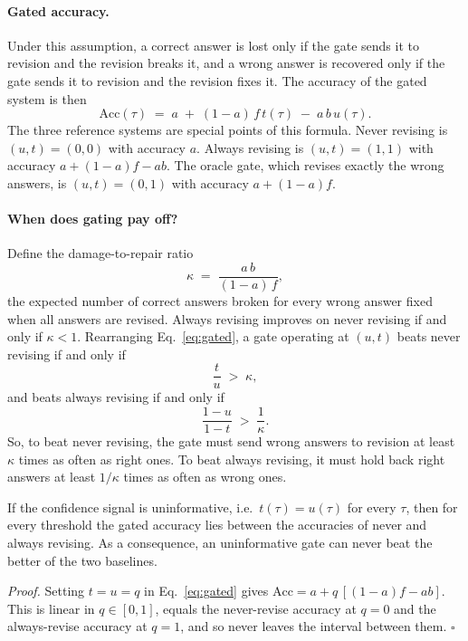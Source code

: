 \paragraph{Gated accuracy.} Under this assumption, a correct answer is lost only if the gate sends it to revision and the revision breaks it, and a wrong answer is recovered only if the gate sends it to revision and the revision fixes it. The accuracy of the gated system is then
\begin{equation}
\mathrm{Acc}(\tau) \;=\; a \;+\; (1-a)\,f\,t(\tau) \;-\; a\,b\,u(\tau).
\label{eq:gated}
\end{equation}
The three reference systems are special points of this formula. Never revising is $(u,t)=(0,0)$ with accuracy $a$. Always revising is $(u,t)=(1,1)$ with accuracy $a+(1-a)f-ab$. The oracle gate, which revises exactly the wrong answers, is $(u,t)=(0,1)$ with accuracy $a+(1-a)f$.

\paragraph{When does gating pay off?} Define the damage-to-repair ratio
\begin{equation}
\kappa \;=\; \frac{a\,b}{(1-a)\,f},
\end{equation}
the expected number of correct answers broken for every wrong answer fixed when all answers are revised. Always revising improves on never revising if and only if $\kappa<1$. Rearranging Eq.~\eqref{eq:gated}, a gate operating at $(u,t)$ beats never revising if and only if
\begin{equation}
\frac{t}{u} \;>\; \kappa,
\label{eq:beat_never}
\end{equation}
and beats always revising if and only if
\begin{equation}
\frac{1-u}{1-t} \;>\; \frac{1}{\kappa}.
\label{eq:beat_always}
\end{equation}
So, to beat never revising, the gate must send wrong answers to revision at least $\kappa$ times as often as right ones. To beat always revising, it must hold back right answers at least $1/\kappa$ times as often as wrong ones.

\begin{proposition}
\label{prop:nofree}
If the confidence signal is uninformative, i.e.\ $t(\tau)=u(\tau)$ for every $\tau$, then for every threshold the gated accuracy lies between the accuracies of never and always revising. As a consequence, an uninformative gate can never beat the better of the two baselines.
\end{proposition}
\noindent\textit{Proof.} Setting $t=u=q$ in Eq.~\eqref{eq:gated} gives $\mathrm{Acc}=a+q\,[(1-a)f-ab]$. This is linear in $q\in[0,1]$, equals the never-revise accuracy at $q=0$ and the always-revise accuracy at $q=1$, and so never leaves the interval between them. $\square$

